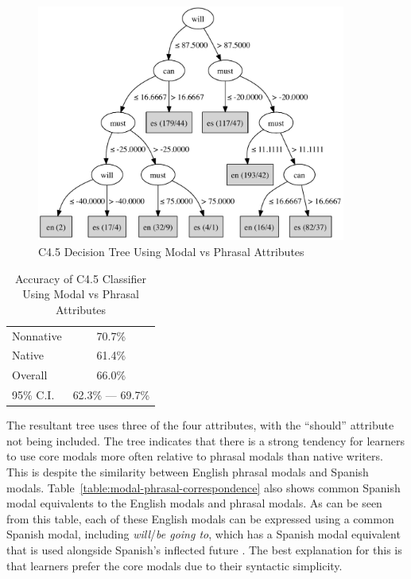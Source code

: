 \documentclass[main.tex]{subfiles}
\begin{document}
\begin{figure}[htbp]
\centering
\includegraphics[width=4in]{modal-phrasal-tree.pdf}
\caption{C4.5 Decision Tree Using Modal vs Phrasal Attributes}
\label{fig:modal-phrasal-tree}
\end{figure}
\begin{table}[htbp]
\centering
\caption{Accuracy of C4.5 Classifier Using Modal vs Phrasal Attributes}
\begin{tabular}{l c}
\toprule
Nonnative & 70.7\% \\
Native & 61.4\% \\
Overall & 66.0\% \\
95\% C.I. & 62.3\% --- 69.7\%\\
\bottomrule
\end{tabular}
\label{table:modal-phrasal-results}
\end{table}

The resultant tree uses three of the four attributes, with the ``should'' attribute not being included. The tree indicates that there is a strong tendency for learners to use core modals more often relative to phrasal modals than native writers. This is despite the similarity between English phrasal modals and Spanish modals. Table~\ref{table:modal-phrasal-correspondence} also shows common Spanish modal equivalents to the English modals and phrasal modals. As can be seen from this table, each of these English modals can be expressed using a common Spanish modal, including \textit{will}/\textit{be going to}, which has a Spanish modal equivalent that is used alongside Spanish's inflected future \citep[p. 221]{butt}. The best explanation for this is that learners prefer the core modals due to their syntactic simplicity.
\end{document}
